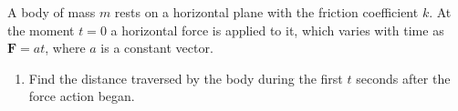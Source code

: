 \item A body of mass \( m \) rests on a horizontal plane with the friction coefficient \( k \). At the moment \( t = 0 \) a horizontal force is applied to it, which varies with time as \( \mathbf{F} = at \), where \( a \) is a constant vector.
    \begin{enumerate}
        \item Find the distance traversed by the body during the first \( t \) seconds after the force action began.
    \end{enumerate}